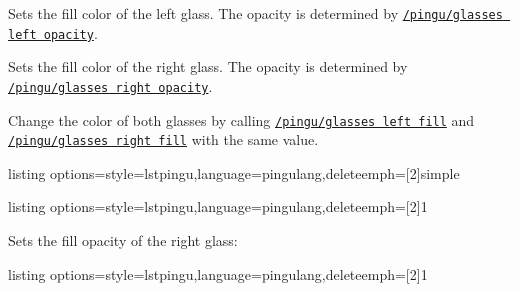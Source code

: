 \documentclass[parskip=half,english,numbers=noenddot,footnotes=nomultiple,oneside]{scrartcl}
\def\lpingu#1{\lstinline[style=lstpingu,language=pingulang]'#1'}
\newcommand*\keyref[2][/pingu/]{\hyperref[pk:#1#2]{\lpingu{#1#2}}}
\begin{document}
	Sets the fill color of the left glass. The opacity is determined by \keyref{glasses left opacity}.
\begin{tcblisting}{}
\begin{tikzpicture}
	\pingu[glasses,
	       glasses left fill=green]
\end{tikzpicture}
\end{tcblisting}
\endsubkeyexplain

	Sets the fill color of the right glass. The opacity is determined by \keyref{glasses right opacity}.
\begin{tcblisting}{}
\begin{tikzpicture}
	\pingu[glasses,
	       glasses right fill=green]
\end{tikzpicture}
\end{tcblisting}
\endsubkeyexplain

	Change the color of both glasses by calling \keyref{glasses left fill} and \keyref{glasses right fill} with the same value.
\begin{tcblisting}{listing options={style=lstpingu,language=pingulang,deleteemph={[2]{simple}}}}
\begin{tikzpicture}
	\pingu[glasses, glasses fill=green]
\end{tikzpicture}
\end{tcblisting}
\endsubkeyexplain

\begin{tcblisting}{listing options={style=lstpingu,language=pingulang,deleteemph={[2]{1}}}}
\begin{tikzpicture}
	\pingu[glasses,
	       glasses left fill=green,
				 glasses left opacity=1]
\end{tikzpicture}
\end{tcblisting}
\endsubkeyexplain

	Sets the fill opacity of the right glass:
\begin{tcblisting}{listing options={style=lstpingu,language=pingulang,deleteemph={[2]{1}}}}
\begin{tikzpicture}
	\pingu[glasses,
	       glasses right fill=green,
				 glasses right opacity=1]
\end{tikzpicture}
\end{tcblisting}
\endsubkeyexplain
\end{document}
